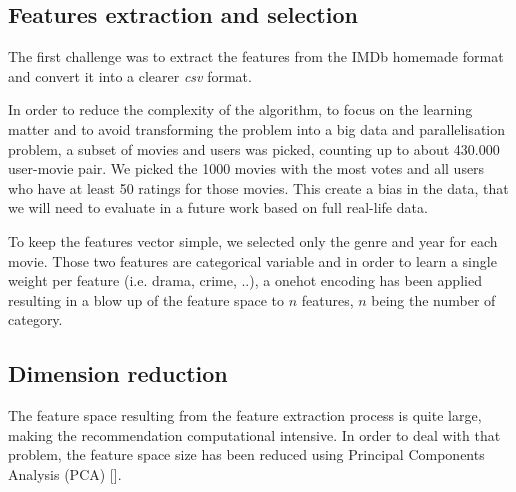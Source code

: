 \documentclass[letterpaper]{article}
\begin{document}
\subsection{Features extraction and selection}

The first challenge was to extract the features from the IMDb homemade format and convert it into a clearer \textit{csv} format.

In order to reduce the complexity of the algorithm, to focus on the learning matter and to avoid transforming the problem into a big data and parallelisation problem, a subset of movies and users was picked, counting up to about 430.000 user-movie pair. We picked the 1000 movies with the most votes and all users who have at least 50 ratings for those movies. This create a bias in the data, that we will need to evaluate in a future work based on full real-life data.

To keep the features vector simple, we selected only the genre and year for each movie. Those two features are categorical variable and in order to learn a single weight per feature (i.e. drama, crime, ..), a onehot encoding has been applied resulting in a blow up of the feature space to $n$ features, $n$ being the number of category.

\begin{table}[h]
\vskip 0.25cm
\caption{Movies feature space}
\end{table}


\subsection{Dimension reduction}

The feature space resulting from the feature extraction process is quite large, making the recommendation computational intensive.
In order to deal with that problem, the feature space size has been reduced using Principal Components Analysis (PCA) [\cite{principalcompanalysis}].
\end{document}

